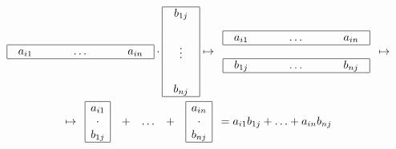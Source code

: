 \begin{gather*}
\begin{array}{ccc}
\hline
\multicolumn{1}{|c}{
\begin{array}{cc}
{a_{i1}}&{\hphantom{\ldots}}
\end{array}
}&{\ldots}&\multicolumn{1}{c|}{
\begin{array}{cc}
{\hphantom{\ldots}}&{a_{in}}
\end{array}
}\\
\hline
\end{array}
\cdot
\begin{array}{|c|}
\hline
{
\begin{array}{c}
{b_{1j}}\\
{\vphantom{\vdots}}
\end{array}
}\\
{\vdots}\\
{
\begin{array}{c}
{\vphantom{\vdots}}\\
{b_{nj}}
\end{array}
}\\
\hline
\end{array}
\mapsto
\begin{array}{c}
{
\begin{array}{ccc}
\hline
\multicolumn{1}{|c}{
\begin{array}{cc}
{a_{i1}}&{\hphantom{\ldots}}
\end{array}
}&{\ldots}&\multicolumn{1}{c|}{
\begin{array}{cc}
{\hphantom{\ldots}}&{a_{in}}
\end{array}
}\\
\hline
\end{array}
}\\
{}\\
{
\begin{array}{ccc}
\hline
\multicolumn{1}{|c}{
\begin{array}{cc}
{b_{1j}}&{\hphantom{\ldots}}
\end{array}
}&{\ldots}&\multicolumn{1}{c|}{
\begin{array}{cc}
{\hphantom{\ldots}}&{b_{nj}}
\end{array}
}\\
\hline
\end{array}
}
\end{array}\mapsto
\\
\mapsto
\begin{array}{ccccc}
{
\begin{array}{|c|}
\hline
{a_{i1}}\\{\cdot}\\{b_{1j}}\\
\hline
\end{array}
}&{+}&{\ldots}&{+}&{
\begin{array}{|c|}
\hline
{a_{in}}\\{\cdot}\\{b_{nj}}\\
\hline
\end{array}
}\\
\end{array}
=
a_{i1} b_{1j} + \ldots + a_{in} b_{nj}
\end{gather*}

